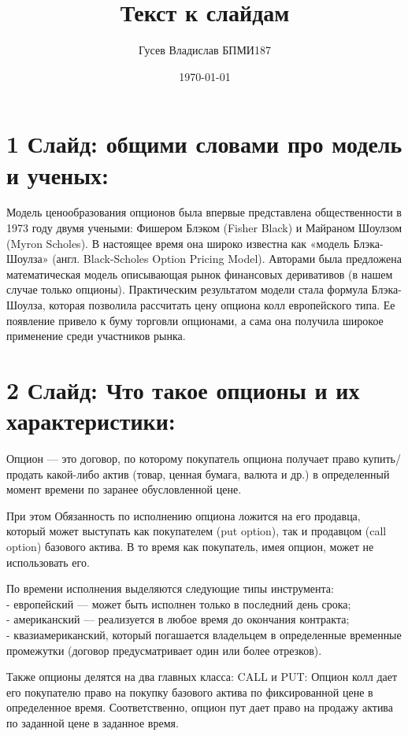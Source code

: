 \documentclass[a4paper]{article}
\title{Текст к слайдам}
\author{Гусев Владислав БПМИ187}
\date{\today}
\begin{document}
\maketitle

\section*{1 Слайд: общими словами про модель и ученых:}
Модель ценообразования опционов была впервые представлена общественности в 1973 году двумя учеными: Фишером Блэком (Fisher Black) и Майраном Шоулзом (Myron Scholes). В настоящее время она широко известна как «модель Блэка-Шоулза» (англ. Black-Scholes Option Pricing Model). Авторами была предложена математическая модель описывающая рынок финансовых деривативов (в нашем случае только опционы). Практическим результатом модели стала формула Блэка-Шоулза, которая позволила рассчитать цену опциона колл европейского типа. Ее появление привело к буму торговли опционами, а сама она получила широкое применение среди участников рынка.

\section*{2 Слайд: Что такое опционы и их характеристики:}
Опцион — это договор, по которому покупатель опциона получает право купить/продать какой-либо актив (товар, ценная бумага, валюта и др.) в определенный момент времени по заранее обусловленной цене. 

При этом Обязанность по исполнению опциона ложится на его продавца, который может выступать как покупателем (put option), так и продавцом (call option) базового актива. В то время как покупатель, имея опцион, может не использовать его.

По времени исполнения выделяются следующие типы инструмента: \\
- европейский — может быть исполнен только в последний день срока; \\
- американский — реализуется в любое время до окончания контракта; \\
- квазиамериканский, который погашается владельцем в определенные временные промежутки (договор предусматривает один или более отрезков). 

Также опционы делятся на два главных класса: CALL и PUT:
Опцион колл дает его покупателю право на покупку базового актива по фиксированной цене в определенное время. Соответственно, опцион пут дает право на продажу актива по заданной цене в заданное время.
\end{document}
